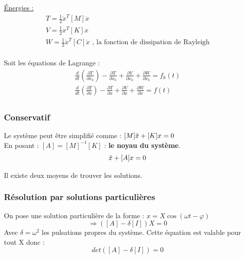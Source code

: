 \documentclass[../main.tex]{subfiles}
\begin{document}
\quad \underline{Énergies :}\\

\begin{equation}
    \begin{gathered}
        T = \frac{1}{2}\dot{x}^T[M] \dot{x}\\
        V = \frac{1}{2} x^T[K]x\\
        W = \frac{1}{2}\dot{x}^T[C]\dot{x} \text{ , la fonction de dissipation de Rayleigh}\\
    \end{gathered}
\end{equation}

Soit les équations de Lagrange : \begin{equation}
    \begin{gathered}
        \frac{d}{dt}(\frac{\partial T}{\partial \dot{x}_k}) - \frac{\partial T}{\partial x_k} + \frac{\partial V}{\partial x_k} + \frac{\partial W}{\partial \dot{x}_k} = f_k(t)\\
        \frac{d}{dt}(\frac{\partial T}{\partial \dot{x}}) - \frac{\partial T}{\partial x} + \frac{\partial V}{\partial x} + \frac{\partial W}{\partial \dot{x}} = f(t)\\
    \end{gathered}
\end{equation}

\subsubsection{Conservatif}
Le système peut être simplifié comme : $[M]\Ddot{x} + [K]x=0$\\

En posant : $[A] = [M]^{-1}[K]$ : \textbf{le noyau du système}.\\

\begin{equation}
    \Ddot{x} + [A] x = 0
\end{equation}

Il existe deux moyens de trouver les solutions.\\

\subsubsection{Résolution par solutions particulières}

On pose une solution particulière de la forme : $x = X\cos(\omega t-\varphi)$\\
\begin{equation}
    \Rightarrow ([A]-\delta[I])X = 0
\end{equation}
Avec $\delta = \omega^2$ les pulsations propres du système. Cette équation est valable pour tout X donc : 
\begin{equation}
    det([A]-\delta[I])=0
\end{equation}
\end{document}
